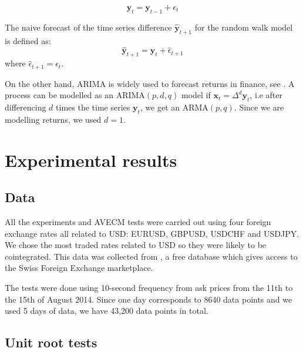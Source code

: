 \begin{equation}
\mathbf{y}_t = \mathbf{y}_{t-1} + \epsilon_{t}
\label{rwmodel}
\end{equation}

The naive forecast of the time series difference $\hat{\mathbf{y}}_{t+1}$ for
the random walk model is defined as:
\begin{equation}
\hat{\mathbf{y}}_{t+1} = \mathbf{y}_t + \hat{\epsilon}_{t+1} 
\end{equation}
\noindent where  $\hat{\epsilon}_{t+1} = \epsilon_{t}$.

On the other hand, ARIMA is widely used to forecast returns in finance, see
\cite{tsay2005}. A process can be modelled as an ARIMA$(p,d,q)$ model if
$\mathbf{x}_t=\Delta^d \mathbf{y}_t $, i.e after differencing $d$ times the time
series $\mathbf{y}_t$,  we get an ARMA$(p,q)$. Since we are modelling returns,
we used $d=1$.


\section{Experimental results}
\label{sec:51results}
\subsection{Data}
All the experiments and AVECM tests were carried out using four foreign exchange rates all related to
USD: EURUSD, GBPUSD, USDCHF and USDJPY. We chose the most traded rates related
to USD so they were likely to be cointegrated. 
This data was collected from
\cite{Dukascopy2014}, a free database which gives access to the Swiss Foreign
Exchange marketplace.

The tests were done using 10-second frequency from ask prices from the 11th to
the 15th of August 2014. Since one day corresponds to 8640 data points and we
used 5 days of data, we have 43,200 data points in total.

\subsection{Unit root tests}

